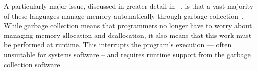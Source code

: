A particularly major issue, discussed in greater detail in ~, is that a vast majority of these languages manage memory automatically through garbage collection~\cite{Bartley:2003:GC:1074100.1074419,Dijkstra:1978:OGC:359642.359655}. While garbage collection means that programmers no longer have to worry about managing memory allocation and deallocation, it also means that this work must be performed at runtime. This interrupts the program's execution –– often unsuitable for systems software -- and requires runtime support from the garbage collection software~\cite{Bartley:2003:GC:1074100.1074419,Hertz:2005:QPG:1094811.1094836,Dijkstra:1978:OGC:359642.359655}.

%
%
%
